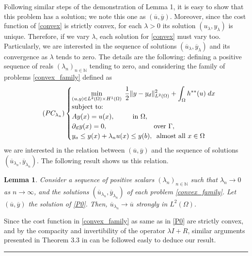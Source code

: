\documentclass[11pt,a4paper]{amsart}
\newcommand{\kw}{\rule{2mm}{2mm}}
\newcommand{\om}{\Omega}
\renewenvironment{proof}{{Proof.}}{\hfill\kw}
\newtheorem{lemma}{{Lemma}}
\newcommand{\norm}[1]{\lVert #1 \rVert}
\begin{document}
    Following similar steps of the demonstration of Lemma 1, it is easy to show that this problem has a solution; we note this one as $(\overline{u}, \overline{y})$. Moreover, since the cost function of \eqref{convex} is strictly convex, for each $\lambda>0$ its solution $(u_{\lambda},y_{\lambda})$ is unique. Therefore, if we vary $\lambda$, each solution for \eqref{convex} must vary too. Particularly, we are interested in the sequence of solutions $(\overline{u}_{\lambda}, \overline{y}_{\lambda})$ and its convergence as $\lambda$ tends to zero. The details are the following: defining a positive sequence of reals $(\lambda_n)_{n\in \mathbb{N}}$ tending to zero, and considering the family of problems \eqref{convex_family} defined as
   \begin{equation}\label{convex_family}\tag{$PC_{\lambda_n}$}
    \begin{cases}
    \displaystyle\min_{(u,y)\in L^2(\om)\times H^1(\Omega)} \;\frac{1}{2}\norm{y-y_d}^2_{L^2(\om)}+\int_{\Omega}h^{**}(u)\; dx\\
    \mbox{subject to:}\\
    Ay(x)=u(x), \phantom{aaaaa} \mbox{in } \om,\\
    \partial_{\Vec{n}}y(x)=0, \phantom{aaaaaaaaaaaaa} \mbox{over } \Gamma,\\    
    y_a\le y(x)+\lambda_n u(x)\le y(b),\phantom{a} \mbox{almost all }x\in \Omega
    \end{cases}
    \end{equation}
   we are interested in the relation between $(\overline{u},\overline{y})$ and the sequence of solutions $(\overline{u}_{\lambda_n}, \overline{y}_{\lambda_n})$. The following result shows us this relation.
   
\begin{lemma}
    Consider a sequence of positive scalars $(\lambda_n)_{n\in\mathbb{N}}$ such that $\lambda_n\to 0$ as $n\to \infty$, and the solutions $(\overline{u}_{\lambda_n}, \overline{y}_{\lambda_n})$ of each problem \eqref{convex_family}. Let $(\overline{u},\overline{y})$ the solution of \eqref{P0}. Then, $\overline{u}_{\lambda_n}\to \overline{u}$ strongly in $L^2(\Omega)$.
\end{lemma}

\begin{proof}
Since the cost function in \eqref{convex_family} as same as in \eqref{P0} are strictly convex, and by the compacity and invertibility of the operator $\lambda I+R$, similar arguments presented in Theorem 3.3 in \cite{meyer1} can be followed easly to deduce our result.
\end{proof}\\
\end{document}

